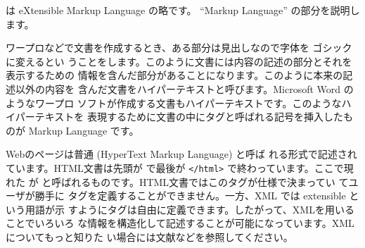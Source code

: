 は eXtensible Markup Language の略です。
``Markup Language'' の部分を説明します。

ワープロなどで文書を作成するとき、ある部分は見出しなので字体を
ゴシックに変えるとい
うことをします。このように文書には内容の記述の部分とそれを表示するための
情報を含んだ部分があることになります。このように本来の記述以外の内容を
含んだ文書をハイパーテキストと呼びます。Microsoft Word のようなワープロ
ソフトが作成する文書もハイパーテキストです。このようなハイパーテキストを
表現するために文書の中にタグと呼ばれる記号を挿入したものが Markup
Language です。

Webのページは普通 (HyperText Markup Language) と呼ば
れる形式で記述されています。HTML文書は先頭が で最後が
\texttt{</html>} で終わっています。ここで現れた  が
と呼ばれるものです。HTML文書ではこのタグが仕様で決まってい
てユーザが勝手に
タグを定義することができません。一方、XML では extensible という用語が示
すようにタグは自由に定義できます。したがって、XMLを用いることでいろいろ
な情報を構造化して記述することが可能になっています。XMLについてもっと知りた
い場合には文献\cite{IntroXML}などを参照してください。

